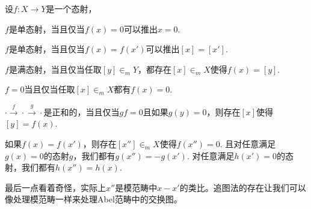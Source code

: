 \begin{pro}[追图法]
设$f:X\to Y$是一个态射，
\begin{compactenum}[~~~(1)]
\item $f$是单态射，当且仅当$f(x)=0$可以推出$x=0$.
\item $f$是单态射，当且仅当$f(x)=f(x')$可以推出$[x]=[x']$.
\item $f$是满态射，当且仅当任取$[y]\in_m Y$，都存在$[x]\in_m X$使得$f(x)=[y]$.
\item $f=0$当且仅当任取$[x]\in_m X$都有$f(x)=0$.
\item $\cdot \xrightarrow{f} \cdot \xrightarrow{g}\cdot$是正和的，当且仅当$gf=0$且如果$g(y)=0$，则存在$[x]$使得$[y]=f(x)$.
\item 如果$f(x)=f(x')$，则存在$[x'']\in_m X$使得$f(x'')=0$. 且对任意满足$g(x)=0$的态射$g$，我们都有$g(x'')=-g(x')$. 对任意满足$h(x')=0$的态射，我们都有$h(x'')=h(x)$.
\end{compactenum}
\end{pro}

最后一点看着奇怪，实际上$x''$是模范畴中$x-x'$的类比。追图法的存在让我们可以像处理模范畴一样来处理Abel范畴中的交换图。

